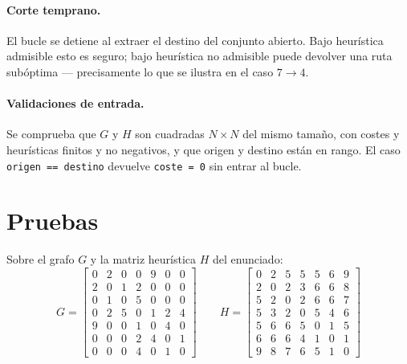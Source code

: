 \paragraph{Corte temprano.} El bucle se detiene al extraer el destino del conjunto abierto. Bajo heur\'{i}stica admisible esto es seguro; bajo heur\'{i}stica no admisible puede devolver una ruta sub\'{o}ptima --- precisamente lo que se ilustra en el caso $7\to 4$.

\paragraph{Validaciones de entrada.} Se comprueba que $G$ y $H$ son cuadradas $N\times N$ del mismo tama\~{n}o, con costes y heur\'{i}sticas finitos y no negativos, y que origen y destino est\'{a}n en rango. El caso \texttt{origen == destino} devuelve \texttt{coste = 0} sin entrar al bucle.


\section{Pruebas}

Sobre el grafo $G$ y la matriz heur\'{i}stica $H$ del enunciado:
\begin{equation*}
  G = \begin{bmatrix}
    0 & 2 & 0 & 0 & 9 & 0 & 0 \\
    2 & 0 & 1 & 2 & 0 & 0 & 0 \\
    0 & 1 & 0 & 5 & 0 & 0 & 0 \\
    0 & 2 & 5 & 0 & 1 & 2 & 4 \\
    9 & 0 & 0 & 1 & 0 & 4 & 0 \\
    0 & 0 & 0 & 2 & 4 & 0 & 1 \\
    0 & 0 & 0 & 4 & 0 & 1 & 0
  \end{bmatrix}
  \qquad
  H = \begin{bmatrix}
    0 & 2 & 5 & 5 & 5 & 6 & 9 \\
    2 & 0 & 2 & 3 & 6 & 6 & 8 \\
    5 & 2 & 0 & 2 & 6 & 6 & 7 \\
    5 & 3 & 2 & 0 & 5 & 4 & 6 \\
    5 & 6 & 6 & 5 & 0 & 1 & 5 \\
    6 & 6 & 6 & 4 & 1 & 0 & 1 \\
    9 & 8 & 7 & 6 & 5 & 1 & 0
  \end{bmatrix}
\end{equation*}

